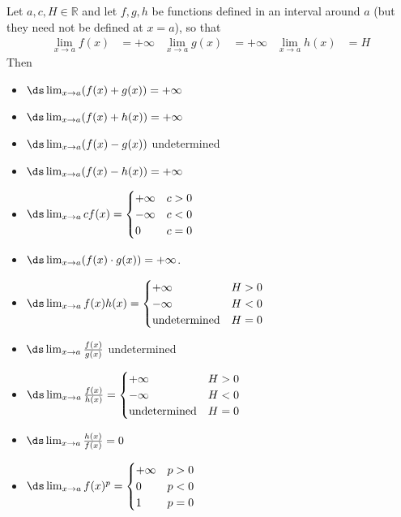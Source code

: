 \begin{theorem}
Let $a,c,H \in \mathbb{R}$ and let $f,g,h$ be functions defined in
an interval around $a$ (but they need not be defined at $x=a$), so that
\begin{align*}
  \lim_{x \to a} f(x) &= +\infty &
  \lim_{x \to a} g(x) &= +\infty &
  \lim_{x \to a} h(x) &= H
\end{align*}
Then
\begin{itemize}
\item $\ds \lim_{x \to a} ( f(x) + g(x) ) = +\infty$
\item $\ds \lim_{x \to a} ( f(x) + h(x) ) = +\infty$
\item $\ds \lim_{x \to a} ( f(x) - g(x) )$ undetermined
\item $\ds \lim_{x \to a} ( f(x) - h(x) ) = +\infty$
\item $\ds \lim_{x \to a} c f(x) =
\begin{cases}
+\infty & c>0 \\
-\infty & c<0 \\
0       & c=0
\end{cases}$
\item $\ds \lim_{x \to a} ( f(x) \cdot g(x) ) = +\infty$.
\item $\ds \lim_{x \to a} f(x) h(x) =
\begin{cases}
+\infty & H>0 \\
-\infty & H<0\\
\text{undetermined} & H=0
\end{cases}
$
\item $\ds \lim_{x \to a} \frac{f(x)}{g(x)}$ undetermined
\item $\ds \lim_{x \to a} \frac{f(x)}{h(x)} =
\begin{cases}
+\infty & H>0 \\
-\infty & H<0\\
\text{undetermined} & H=0
\end{cases}$
\item $\ds \lim_{x \to a} \frac{h(x)}{f(x)} = 0$
\item $\ds \lim_{x \to a} f(x)^p =
\begin{cases}
+\infty & p>0 \\
0 & p<0\\
1 & p=0
\end{cases}$
\end{itemize}
\end{theorem}
